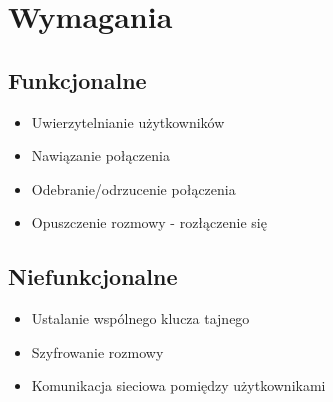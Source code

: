 \section{Wymagania}

\subsection{Funkcjonalne}

\begin{itemize}
    \item Uwierzytelnianie użytkowników
    \item Nawiązanie połączenia
    \item Odebranie/odrzucenie połączenia
    \item Opuszczenie rozmowy - rozłączenie się
\end{itemize}


\subsection{Niefunkcjonalne}

\begin{itemize}
    \item Ustalanie wspólnego klucza tajnego
    \item Szyfrowanie rozmowy
    \item Komunikacja sieciowa pomiędzy użytkownikami
\end{itemize}